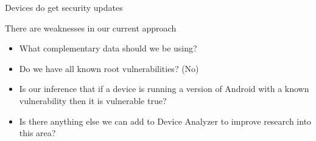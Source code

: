 \documentclass{beamer}
\begin{document}
\begin{frame}[plain]{Devices do get security updates}{}
 \begin{center}
  \vspace{-0.2em}
  \hspace{-2em}
 \end{center}
\end{frame}

\begin{frame}{There are weaknesses in our current approach}{}
 \begin{itemize}
  \item What complementary data should we be using?
  \item Do we have all known root vulnerabilities? (No)
  \item Is our inference that if a device is running a version of Android with a known vulnerability then it is vulnerable true?
  \item Is there anything else we can add to Device Analyzer to improve research into this area?
 \end{itemize}
\end{frame}
\end{document}

